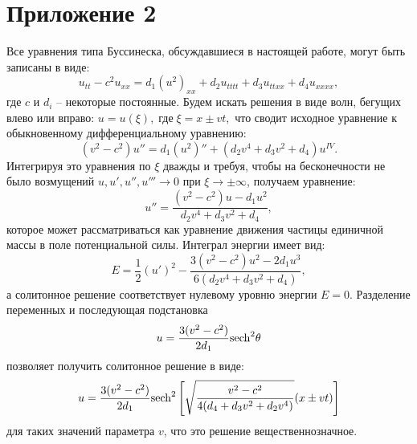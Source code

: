 \documentclass[12pt, a4paper]{report}
\begin{document}
\chapter*{Приложение 2}	
Все уравнения типа Буссинеска, обсуждавшиеся в настоящей работе, могут быть записаны в виде:
\begin{equation}
u_{tt} - c^2 u_{xx} = d_1 (u^2)_{xx} + d_2 u_{tttt} + d_3 u_{ttxx} + d_4 u_{xxxx},
\end{equation}
где $c$ и $d_i$ -- некоторые постоянные. Будем искать решения в виде волн, бегущих влево или вправо:
$
u = u(\xi), \; \mbox{где} \; \xi = x \pm vt,
$
что сводит исходное уравнение к обыкновенному дифференциальному уравнению:
\begin{equation}
(v^2 - c^2) u'' = d_1 (u^2)'' + (d_2 v^4 + d_3 v^2 + d_4) u^{IV}.
\label{ODE}
\end{equation}
Интегрируя это уравнения по $\xi$ дважды и требуя, чтобы на бесконечности не было возмущений $u, u', u'', u''' \to 0$ при $\xi \to \pm \infty$, получаем уравнение:
\begin{equation}
u'' = \frac{(v^2-c^2) u - d_1 u^2}{d_2 v^4 + d_3 v^2 + d_4},
\end{equation}
которое может рассматриваться как уравнение движения частицы единичной массы в поле потенциальной силы. Интеграл энергии имеет вид:
\begin{equation}
E = \frac 12 \left (u' \right )^2 - \frac{3 (v^2-c^2) u^2 - 2 d_1 u^3}{6 (d_2 v^4 + d_3 v^2 + d_4)},
\end{equation}
а солитонное решение соответствует нулевому уровню энергии $E=0$. Разделение переменных и последующая подстановка
$$
u = \frac{3 (v^2 - c^2)}{2 d_1} {\rm sech}^2 \theta
$$
позволяет получить солитонное решение в виде:
\begin{equation}
u = \frac{3 (v^2 - c^2)}{2 d_1} {\rm sech}^2 \left [\sqrt{\frac{v^2 - c^2}{4 (d_4 + d_3 v^2 + d_2 v^4)}} (x \pm v t)\right ]
\end{equation}
для таких значений параметра $v$, что это решение вещественнозначное.

	
\end{document}
